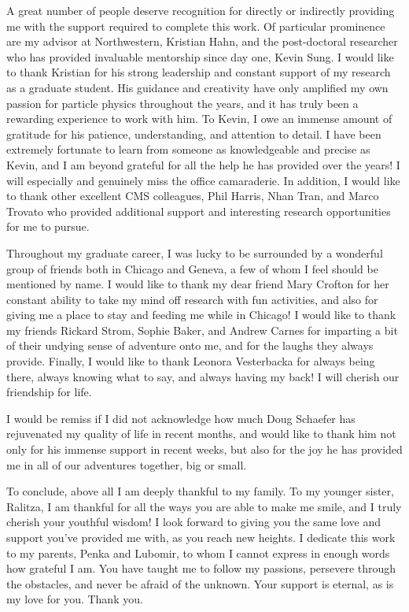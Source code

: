 \begin{acknowledgements}

A great number of people deserve recognition for directly or indirectly providing me with the support required to complete this work. Of particular prominence are my advisor at Northwestern, Kristian Hahn, and the post-doctoral researcher who has provided invaluable mentorship since day one, Kevin Sung. I would like to thank Kristian for his strong leadership and constant support of my research as a graduate student. His guidance and creativity have only amplified my own passion for particle physics throughout the years, and it has truly been a rewarding experience to work with him. To Kevin, I owe an immense amount of gratitude for his patience, understanding, and attention to detail. I have been extremely fortunate to learn from someone as knowledgeable and precise as Kevin, and I am beyond grateful for all the help he has provided over the years! I will especially and genuinely miss the office camaraderie. In addition, I would like to thank other excellent CMS colleagues, Phil Harris, Nhan Tran, and Marco Trovato who provided additional support and interesting research opportunities for me to pursue.

Throughout my graduate career, I was lucky to be surrounded by a wonderful group of friends both in Chicago and Geneva, a few of whom I feel should be mentioned by name. I would like to thank my dear friend Mary Crofton for her constant ability to take my mind off research with fun activities, and also for giving me a place to stay and feeding me while in Chicago! I would like to thank my friends Rickard Strom, Sophie Baker, and Andrew Carnes for imparting a bit of their undying sense of adventure onto me, and for the laughs they always provide. Finally, I would like to thank Leonora Vesterbacka for always being there, always knowing what to say, and always having my back! I will cherish our friendship for life. 

I would be remiss if I did not acknowledge how much Doug Schaefer has rejuvenated my quality of life in recent months, and would like to thank him not only for his immense support in recent weeks, but also for the joy he has provided me in all of our adventures together, big or small. 

To conclude, above all I am deeply thankful to my family. To my younger sister, Ralitza, I am thankful for all the ways you are able to make me smile, and I truly cherish your youthful wisdom! I look forward to giving you the same love and support you've provided me with, as you reach new heights. I dedicate this work to my parents, Penka and Lubomir, to whom I cannot express in enough words how grateful I am. You have taught me to follow my passions, persevere through the obstacles, and never be afraid of the unknown. Your support is eternal, as is my love for you. Thank you.
                        
        
\end{acknowledgements}


